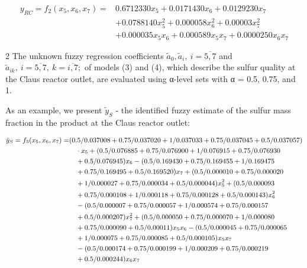 \begin{equation*}
\begin{split}
y_{RC} = f_{2}(x_{5}, x_{6}, x_{7}) = &0.6712330 x_{5} + 0.0171430 x_{6} + 0.0129230 x_{7} \\
&+ 0.0788140 x_{5}^{2} + 0.000058 x_{6}^{2} + 0.00003 x_{7}^{2} \\
&+ 0.000035 x_{5} x_{6} + 0.000589 x_{5} x_{7} + 0.0000250 x_{6} x_{7}
\end{split}
\end{equation*}

\begin{multicols}{2}
The unknown fuzzy regression coefficients
\({\widetilde{a}}_{0},{\widetilde{a}}_{i},\ i =\overline{5,7}\)
and \(\tilde{a}_{ik}, \ i = \overline{5,7}, \ k = \overline{i,7};\)
of models (3) and (4), which describe the sulfur quality at the Claus
reactor outlet, are evaluated using α-level sets with α = 0.5, 0.75, and
1.

As an example, we present \({\widetilde{y}}_{S}\)
- the identified fuzzy estimate of the sulfur mass fraction in
the product at the Claus reactor outlet:
\end{multicols}
\vspace{-2em}
\begin{equation}
\small
\begin{split}
\tilde{y}_{S} = f_{3}(x_{5}, x_{6}, x_{7}) =
&(0.5/0.037008 + 0.75/0.037020 + 1/0.037033 + 0.75/0.037045 + 0.5/0.037057) \\
&\quad \cdot x_{5} + (0.5/0.076885 + 0.75/0.076900 + 1/0.076915 + 0.75/0.076930 \\
&\quad + 0.5/0.076945) x_{6} - (0.5/0.169430 + 0.75/0.169455 + 1/0.169475 \\
&\quad + 0.75/0.169495 + 0.5/0.169520) x_{7} + (0.5/0.000010 + 0.75/0.000020 \\
&\quad + 1/0.000027 + 0.75/0.000034 + 0.5/0.000044) x_{5}^{2} + (0.5/0.000093 \\
&\quad + 0.75/0.000108 + 1/0.000118 + 0.75/0.000128 + 0.5/0.000143) x_{6}^{2} \\
&\quad - (0.5/0.000007 + 0.75/0.000057 + 1/0.000574 + 0.75/0.000157 \\
&\quad + 0.5/0.000207) x_{7}^{2} + (0.5/0.000050 + 0.75/0.000070 + 1/0.000080 \\
&\quad + 0.75/0.000090 + 0.5/0.00011) x_{5} x_{6} - (0.5/0.000045 + 0.75/0.000065 \\
&\quad + 1/0.000075 + 0.75/0.000085 + 0.5/0.000105) x_{5} x_{7} \\
&\quad - (0.5/0.000174 + 0.75/0.000199 + 1/0.000209 + 0.75/0.000219 \\
&\quad + 0.5/0.000244) x_{6} x_{7}
\end{split}
\end{equation}

